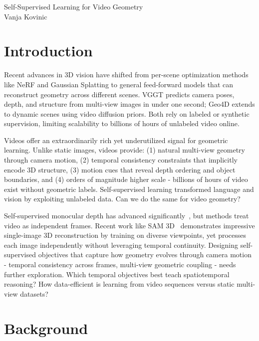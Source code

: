 \documentclass{article}
\begin{document}
\begin{center}
    \LARGE Self-Supervised Learning for Video Geometry\\[0.7em]  %
    \large Vanja Kovinic
    \vspace{1cm}
\end{center}

\section{Introduction}

Recent advances in 3D vision have shifted from per-scene optimization methods like NeRF \cite{nerf} and Gaussian Splatting \cite{gs} to general feed-forward models that can reconstruct geometry across different scenes. VGGT \cite{vggt} predicts camera poses, depth, and structure from multi-view images in under one second; Geo4D \cite{geo4d} extends to dynamic scenes using video diffusion priors. Both rely on labeled or synthetic supervision, limiting scalability to billions of hours of unlabeled video online.

Videos offer an extraordinarily rich yet underutilized signal for geometric learning. Unlike static images, videos provide: (1) natural multi-view geometry through camera motion, (2) temporal consistency constraints that implicitly encode 3D structure, (3) motion cues that reveal depth ordering and object boundaries, and (4) orders of magnitude higher scale - billions of hours of video exist without geometric labels. Self-supervised learning transformed language \cite{bert} and vision \cite{mae,dino} by exploiting unlabeled data. Can we do the same for video geometry?

Self-supervised monocular depth has advanced significantly~\cite{godard2019,watson2021}, but methods treat video as independent frames. Recent work like SAM 3D~\cite{sam3d} demonstrates impressive single-image 3D reconstruction by training on diverse viewpoints, yet processes each image independently without leveraging temporal continuity. Designing self-supervised objectives that capture how geometry evolves through camera motion - temporal consistency across frames, multi-view geometric coupling - needs further exploration. Which temporal objectives best teach spatiotemporal reasoning? How data-efficient is learning from video sequences versus static multi-view datasets?

\vspace{-0.5cm}
\section{Background}
\vspace{-0.5cm}
\end{document}
